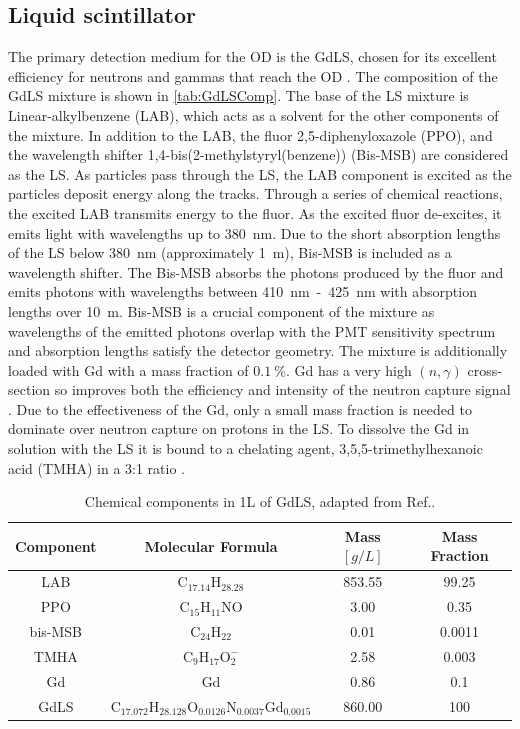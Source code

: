 \subsection{Liquid scintillator}
The primary detection medium for the OD is the GdLS, chosen for its excellent efficiency for neutrons and gammas that reach the OD \cite{LZTDR}. The composition of the GdLS mixture is shown in \autoref{tab:GdLSComp}. The base of the LS mixture is Linear-alkylbenzene (LAB), which acts as a solvent for the other components of the mixture. In addition to the LAB, the fluor 2,5-diphenyloxazole (PPO), and the wavelength shifter 1,4-bis(2-methylstyryl(benzene)) (Bis-MSB) are considered as the LS. As particles pass through the LS, the LAB component is excited as the particles deposit energy along the tracks. Through a series of chemical reactions, the excited LAB transmits energy to the fluor. As the excited fluor de-excites, it emits light with wavelengths up to 380~nm. Due to the short absorption lengths of the LS below 380~nm (approximately 1~m), Bis-MSB is included as a wavelength shifter. The Bis-MSB absorbs the photons produced by the fluor and emits photons with wavelengths between 410~nm~-~425~nm with absorption lengths over 10~m. Bis-MSB is a crucial component of the mixture as wavelengths of the emitted photons overlap with the PMT sensitivity spectrum and absorption lengths satisfy the detector geometry.
The mixture is additionally loaded with Gd with a mass fraction of $0.1~\%$. Gd has a very high $(n,\gamma)$ cross-section so improves both the efficiency and intensity of the neutron capture signal \cite{LZTDR}. Due to the effectiveness of the Gd, only a small mass fraction is needed to dominate over neutron capture on protons in the LS. To dissolve the Gd in solution with the LS it is bound to a chelating agent, 3,5,5-trimethylhexanoic acid (TMHA) in a 3:1 ratio \cite{LZTDR,Haselschwardt:2018vmp}.
\begin{table}
    \centering
    \begin{tabular}{cccc}
        \hline
        \textbf{Component} & \textbf{Molecular Formula} & \textbf{Mass $[g/L]$} & \textbf{Mass Fraction} \\
        \hline
        LAB & $\text{C}_{17.14}\text{H}_{28.28}$ & 853.55 & 99.25\\
        PPO & $\text{C}_{15}\text{H}_{11}\text{NO}$ & 3.00 & 0.35 \\
        bis-MSB & $\text{C}_{24}\text{H}_{22}$ & 0.01 & 0.0011\\
        TMHA & $\text{C}_{9}\text{H}_{17}\text{O}_{2}^{-}$ & 2.58 & 0.003\\
        Gd & Gd & 0.86 & 0.1 \\
        \hline
        GdLS & $\text{C}_{17.072} \text{H}_{28.128} \text{O}_{0.0126} \text{N}_{0.0037} \text{Gd}_{0.0015}$ & 860.00 & 100 \\
        \hline
    \end{tabular}
    \caption{Chemical components in 1L of GdLS, adapted from Ref.\cite{Haselschwardt:2018vmp}.}
    \label{tab:GdLSComp}
\end{table}
